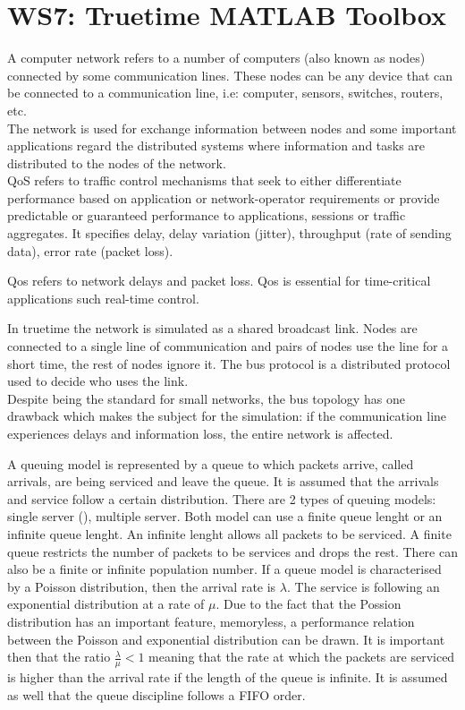 \section{WS7: Truetime MATLAB Toolbox}
\label{section:truetime}

A computer network refers to a number of computers (also known as nodes) connected by some communication lines. These nodes can be any device that can be connected to a communication line, i.e: computer, sensors, switches, routers, etc.\\

The network is used for exchange information between nodes and some important applications regard the distributed systems where information and tasks are distributed to the nodes of the network.\\


QoS refers to traffic control mechanisms that seek to either differentiate performance based on application or network-operator requirements or provide predictable or guaranteed performance to applications, sessions or traffic aggregates. It specifies delay, delay variation (jitter), throughput (rate of sending data), error rate (packet loss).

Qos refers to network delays and packet loss. Qos is essential for time-critical applications such real-time control. 

In truetime the network is simulated as a shared broadcast link. Nodes are connected to a single line of communication and pairs of nodes use the line for a short time, the rest of nodes ignore it. The bus protocol is a distributed protocol used to decide who uses the link.\\
Despite being the standard for small networks, the bus topology has one drawback which makes the subject for the simulation: if the communication line experiences delays and information loss, the entire network is affected.



A queuing model is represented by a queue to which packets arrive, called arrivals, are being serviced and leave the queue. It is assumed that the arrivals and service follow a certain distribution. There are 2 types of queuing models: single server (), multiple server. Both model can use a finite queue lenght or an infinite queue lenght. An infinite lenght allows all packets to be serviced. A finite queue restricts the number of packets to be services and drops the rest. There can also be a finite or infinite population number. If a queue model is characterised by a Poisson distribution, then the arrival rate is $\lambda$. The service is following an exponential distribution at a rate of $\mu$. Due to the fact that the Possion distribution has an important feature, memoryless, a performance relation between the Poisson and exponential distribution can be drawn. It is important then that the ratio $\frac{\lambda}{\mu}<1$ meaning that the rate at which the packets are serviced is higher than the arrival rate if the length of the queue is infinite. It is assumed as well that the queue discipline follows a FIFO order.\\

